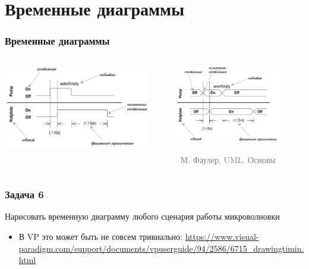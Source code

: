 \documentclass[xetex,mathserif,serif]{beamer}
\newcommand{\attribution}[1] {
	\vspace{-5mm}\begin{flushright}\begin{scriptsize}\textcolor{gray}{\textcopyright\, #1}\end{scriptsize}\end{flushright}
}
\begin{document}
	\section{Временные диаграммы}

	\begin{frame}
		\frametitle{Временные диаграммы}
		\begin{columns}
			\begin{column}{0.5\textwidth}
				\begin{center}
					\includegraphics[width=0.9\textwidth]{timingDiagrams.png}
				\end{center}
			\end{column}
			\begin{column}{0.5\textwidth}
				\begin{center}
					\includegraphics[width=0.8\textwidth]{timingDiagramsAlternate.png}
					\attribution{М. Фаулер, UML. Основы}
				\end{center}
			\end{column}
		\end{columns}
	\end{frame}

	\begin{frame}
		\frametitle{Задача 6}
		Нарисовать временную диаграмму любого сценария работы микроволновки
		\begin{itemize}
			\item В VP это может быть не совсем тривиально: \url{https://www.visual-paradigm.com/support/documents/vpuserguide/94/2586/6715_drawingtimin.html}
		\end{itemize}
	\end{frame}
\end{document}
